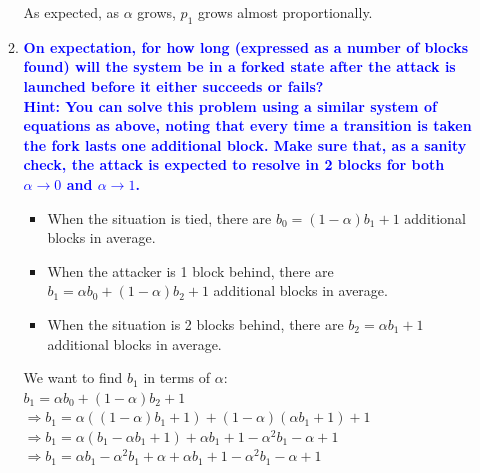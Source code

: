 \documentclass[11pt]{article}
\begin{document}
\begin{enumerate}
\begin{enumerate}
        \newline
        \newline
        \newline
        As expected, as $\alpha$ grows, $p_1$ grows almost proportionally.
    
    \item \textbf{\textcolor{blue}{On expectation, for how long (expressed as a number of blocks found) will the system be in a forked state after the attack is launched before it either succeeds or fails?
    \\ Hint: You can solve this problem using a similar system of equations as above, noting that every time a transition is taken the fork lasts one additional block. Make sure that, as a sanity check, the attack is expected to resolve in 2 blocks for both $\alpha \rightarrow 0$ and $\alpha \rightarrow 1$.}}
        \begin{itemize}
            \item When the situation is tied, there are $b_0 = (1 - \alpha)b_1 + 1$ additional blocks in average.
            \item When the attacker is 1 block behind, there are $b_1 = \alpha b_0 + (1 - \alpha)b_2 + 1$ additional blocks in average.
            \item When the situation is 2 blocks behind, there are $b_2 = \alpha b_1 + 1$ additional blocks in average.
        \end{itemize}
        We want to find $b_1$ in terms of $\alpha$:
        \\ $b_1 = \alpha b_0 + (1 - \alpha)b_2 + 1$
        \\ $\Rightarrow b_1 = \alpha ((1 - \alpha)b_1 + 1) + (1 - \alpha)(\alpha b_1 + 1) + 1$
        \\ $\Rightarrow b_1 = \alpha (b_1 - \alpha b_1 + 1) + \alpha b_1 + 1 - \alpha^2 b_1 - \alpha + 1$
        \\ $\Rightarrow b_1 = \alpha b_1 - \alpha^2 b_1 + \alpha + \alpha b_1 + 1 - \alpha^2 b_1 - \alpha + 1$

\end{enumerate}
\end{enumerate}
\end{document}
